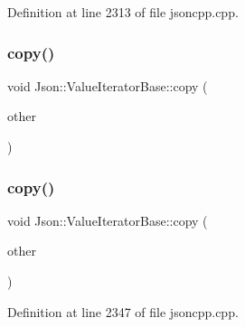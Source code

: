 Definition at line 2313 of file jsoncpp.\+cpp.

\hypertarget{class_json_1_1_value_iterator_base_a496e6aba44808433ec5858c178be5719}{}\label{class_json_1_1_value_iterator_base_a496e6aba44808433ec5858c178be5719} 
\subsubsection{\texorpdfstring{copy()}{copy()}\hspace{0.1cm}{\footnotesize\ttfamily [1/2]}}
{\footnotesize\ttfamily void Json\+::\+Value\+Iterator\+Base\+::copy (\begin{DoxyParamCaption}\item[{const \hyperlink{class_json_1_1_value_iterator_base_a9d2a940d03ea06d20d972f41a89149ee}{Self\+Type} \&}]{other }\end{DoxyParamCaption})\hspace{0.3cm}{\ttfamily [protected]}}

\hypertarget{class_json_1_1_value_iterator_base_a496e6aba44808433ec5858c178be5719}{}\label{class_json_1_1_value_iterator_base_a496e6aba44808433ec5858c178be5719} 
\subsubsection{\texorpdfstring{copy()}{copy()}\hspace{0.1cm}{\footnotesize\ttfamily [2/2]}}
{\footnotesize\ttfamily void Json\+::\+Value\+Iterator\+Base\+::copy (\begin{DoxyParamCaption}\item[{const \hyperlink{class_json_1_1_value_iterator_base_a9d2a940d03ea06d20d972f41a89149ee}{Self\+Type} \&}]{other }\end{DoxyParamCaption})\hspace{0.3cm}{\ttfamily [protected]}}



Definition at line 2347 of file jsoncpp.\+cpp.

\hypertarget{class_json_1_1_value_iterator_base_affc8cf5ff54a9f432cc693362c153fa6}{}\label{class_json_1_1_value_iterator_base_affc8cf5ff54a9f432cc693362c153fa6} 
